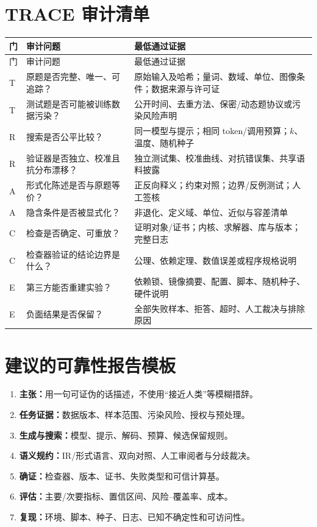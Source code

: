 \documentclass[UTF8,11pt,a4paper,fontset=fandol]{ctexart}
\newcommand{\trace}{\textsf{TRACE}}
\begin{document}
\section{\trace{} 审计清单}
\begin{longtable}{@{}p{0.9cm}>{\raggedright\arraybackslash}p{5.0cm}>{\raggedright\arraybackslash}p{7.8cm}@{}}
\toprule
门 & 审计问题 & 最低通过证据 \\
\midrule
\endfirsthead
\toprule
门 & 审计问题 & 最低通过证据 \\
\midrule
\endhead
T & 原题是否完整、唯一、可追踪？ & 原始输入及哈希；量词、数域、单位、图像条件；数据来源与许可证 \\
T & 测试题是否可能被训练数据污染？ & 公开时间、去重方法、保密/动态题协议或污染风险声明 \\
R & 搜索是否公平比较？ & 同一模型与提示；相同 token/调用预算；$k$、温度、随机种子 \\
R & 验证器是否独立、校准且抗分布漂移？ & 独立测试集、校准曲线、对抗错误集、共享语料披露 \\
A & 形式化陈述是否与原题等价？ & 正反向释义；约束对照；边界/反例测试；人工签核 \\
A & 隐含条件是否被显式化？ & 非退化、定义域、单位、近似与容差清单 \\
C & 检查是否确定、可重放？ & 证明对象/证书；内核、求解器、库与版本；完整日志 \\
C & 检查器验证的结论边界是什么？ & 公理、依赖定理、数值误差或程序规格说明 \\
E & 第三方能否重建实验？ & 依赖锁、镜像摘要、配置、脚本、随机种子、硬件说明 \\
E & 负面结果是否保留？ & 全部失败样本、拒答、超时、人工裁决与排除原因 \\
\bottomrule
\end{longtable}

\section{建议的可靠性报告模板}
\begin{enumerate}
  \item \textbf{主张：}用一句可证伪的话描述，不使用“接近人类”等模糊措辞。
  \item \textbf{任务证据：}数据版本、样本范围、污染风险、授权与预处理。
  \item \textbf{生成与搜索：}模型、提示、解码、预算、候选保留规则。
  \item \textbf{语义规约：}IR/形式语言、双向对照、人工审阅者与分歧裁决。
  \item \textbf{确证：}检查器、版本、证书、失败类型和可信计算基。
  \item \textbf{评估：}主要/次要指标、置信区间、风险--覆盖率、成本。
  \item \textbf{复现：}环境、脚本、种子、日志、已知不确定性和可访问性。
\end{enumerate}
\end{document}
